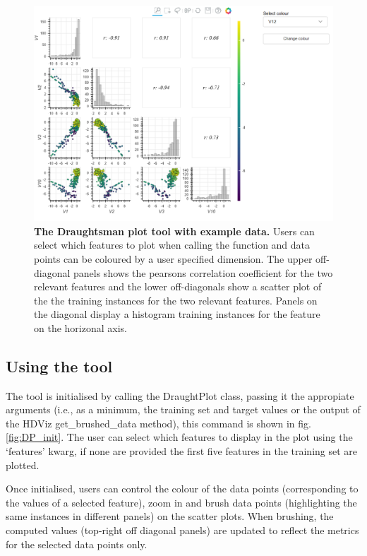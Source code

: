 \documentclass[11pt]{article} %
\begin{document}
\begin{figure}
\centering
\includegraphics[width=5.75in]{images/draughtplot.png}
\caption{\textbf{The Draughtsman plot tool with example data.} Users can select which features to plot when calling the function and data points can be coloured by a user specified dimension. The upper off-diagonal panels shows the pearsons correlation coefficient for the two relevant features and the lower off-diagonals show a scatter plot of the the training instances for the two relevant features. Panels on the diagonal display a histogram training instances for the feature on the horizonal axis.}
\end{figure}

\subsection{Using the tool}

The tool is initialised by calling the DraughtPlot class, passing it the appropiate arguments (i.e., as a minimum, the training set and target values or the output of the HDViz get\_brushed\_data method), this command is shown in fig. \ref{fig:DP_init}. The user can select which features to display in the plot using the `features' kwarg, if none are provided the first five features in the training set are plotted. 

Once initialised, users can control the colour of the data points (corresponding to the values of a selected feature), zoom in and brush data points (highlighting the same instances in different panels) on the scatter plots. When brushing, the computed values (top-right off diagonal panels) are updated to reflect the metrics for the selected data points only.
\end{document}
